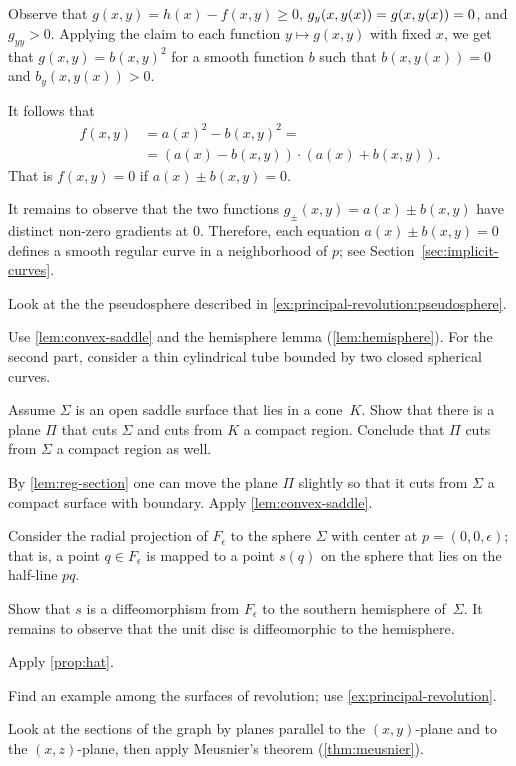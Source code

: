 \begin{multicols}{2}
Observe that $g(x,y)=h(x)-f(x,y)\ge 0$, $g_y(x,y(x))\z=g(x,y(x))\z=0$, and $g_{yy}>0$.
Applying the claim to each function $y\mapsto g(x,y)$ with fixed $x$, we get that $g(x,y)=b(x,y)^2$ for a smooth function $b$ such that 
$b(x,y(x))=0$ and $b_y(x,y(x))>0$.

It follows that 
\begin{align*}
f(x,y)&=a(x)^2-b(x,y)^2=
\\
&=
(a(x)-b(x,y))\cdot (a(x)+b(x,y)).
\end{align*}
That is $f(x,y)=0$ if $a(x)\pm b(x,y) =0$.

It remains to observe that the two functions $g_\pm(x,y)=a(x)\pm b(x,y)$ have distinct non-zero gradients at $0$.
Therefore, each equation $a(x)\pm b(x,y) =0$ defines a smooth regular curve in a neighborhood of $p$;
see Section~\ref{sec:implicit-curves}.

 Look at the the pseudosphere described in \ref{ex:principal-revolution:pseudosphere}.

Use \ref{lem:convex-saddle} and the hemisphere lemma (\ref{lem:hemisphere}).
For the second part, consider a thin cylindrical tube bounded by two closed spherical curves.

Assume $\Sigma$ is an open saddle surface that lies in a cone~$K$.
Show that there is a plane $\Pi$ that cuts $\Sigma$ and cuts from $K$ a compact region.
Conclude that $\Pi$ cuts from $\Sigma$ a compact region as well. 

By \ref{lem:reg-section} one can move the plane $\Pi$ slightly so that it cuts from $\Sigma$ a compact surface with boundary.
Apply \ref{lem:convex-saddle}.


Consider the radial projection of $F_\epsilon$ to the sphere $\Sigma$ with center at $p=(0,0,\epsilon)$;
that is, a point $q\in F_\epsilon$ is mapped to a point $s(q)$ on the sphere that lies on the half-line $pq$.

Show that $s$ is a diffeomorphism from $F_\epsilon$ to the southern hemisphere of~$\Sigma$.
It remains to observe that the unit disc is diffeomorphic to the hemisphere.

 Apply \ref{prop:hat}.

Find an example among the surfaces of revolution;
use \ref{ex:principal-revolution}.

 Look at the sections of the graph by planes parallel to the $(x,y)$-plane and to the $(x,z)$-plane, then apply Meusnier’s theorem (\ref{thm:meusnier}).


\end{multicols}
